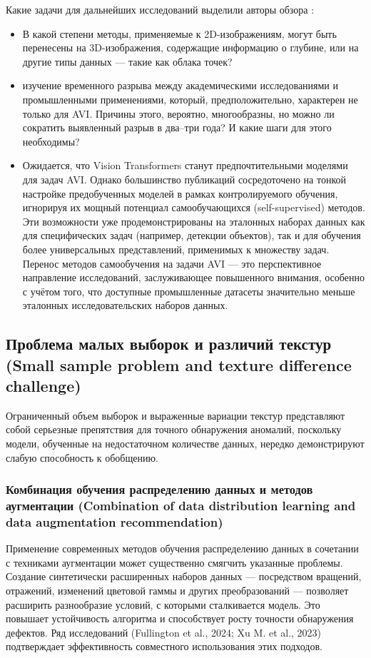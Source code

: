 \documentclass[14pt,a4paper]{article}
\begin{document}
Какие задачи для дальнейших исследований выделили авторы обзора \cite{Hutten2024}:
\begin{itemize}
	\item В какой степени методы, применяемые к 2D-изображениям, могут быть перенесены на 3D-изображения, содержащие информацию о глубине, или на другие типы данных — такие как облака точек?
	\item изучение временного разрыва между академическими исследованиями и промышленными применениями, который, предположительно, характерен не только для AVI. Причины этого, вероятно, многообразны, но можно ли сократить выявленный разрыв в два–три года? И какие шаги для этого необходимы?
	\item Ожидается, что Vision Transformers станут предпочтительными моделями для задач AVI. Однако большинство публикаций сосредоточено на тонкой настройке предобученных моделей в рамках контролируемого обучения, игнорируя их мощный потенциал самообучающихся (self-supervised) методов. Эти возможности уже продемонстрированы на эталонных наборах данных как для специфических задач (например, детекции объектов), так и для обучения более универсальных представлений, применимых к множеству задач. Перенос методов самообучения на задачи AVI — это перспективное направление исследований, заслуживающее повышенного внимания, особенно с учётом того, что доступные промышленные датасеты значительно меньше эталонных исследовательских наборов данных.
\end{itemize}

\subsection{Проблема малых выборок и различий текстур (Small sample problem and texture difference challenge)} 
\cite{Shukla2025}
Ограниченный объем выборок и выраженные вариации текстур представляют собой серьезные препятствия для точного обнаружения аномалий, поскольку модели, обученные на недостаточном количестве данных, нередко демонстрируют слабую способность к обобщению.
\subsubsection{Комбинация обучения распределению данных и методов аугментации (Combination of data distribution learning and data augmentation recommendation)}

Применение современных методов обучения распределению данных в сочетании с техниками аугментации может существенно смягчить указанные проблемы. Создание синтетически расширенных наборов данных — посредством вращений, отражений, изменений цветовой гаммы и других преобразований — позволяет расширить разнообразие условий, с которыми сталкивается модель. Это повышает устойчивость алгоритма и способствует росту точности обнаружения дефектов. Ряд исследований (Fullington et al., 2024; Xu M. et al., 2023) подтверждает эффективность совместного использования этих подходов.
\end{document}
